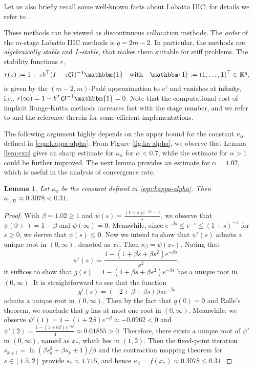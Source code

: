 \documentclass[a4paper, oneside]{book}
\def\R{{\mathbb R}}
\def\AA{\text{${\mathcal O}\hskip-3pt\iota$}}
\newtheorem{lemma}{Lemma}[section]
\begin{document}
Let us also briefly recall some  well-known facts about Lobatto IIIC; for details we refer to \cite{HairerWanner:2010}.

These methods can be viewed as discontinuous collocation methods.
The \textsl{order} of the $m$-stage Lobatto IIIC methods is
$q=2m-2$.
In particular, the methods are \textsl{algebraically stable} and
{\textsl{L-stable}}, that makes them suitable for stiff problems.
The stability functions $r$,
%
\[r(z):=1+z b^\top (I-z\AA)^{-1} \mathbbm{1}\quad\text{with}\quad  \mathbbm{1}:=(1,\dotsc,1)^\top\in \R^q,\]
%
is given by the $(m-2,m)$-Pad\'e
approximation to $e^z$ and
vanishes at infinity, i.e., $r(\infty)=1-b^T \AA^{-1} \mathbbm{1}=0.$
Note that the computational cost of implicit Runge-Kutta methods increases fast with the stage number, and we refer
to \cite{Butcher:1976, RK:1988, JN:1995} and the reference therein for some efficient implementations.

The following argument highly depends on the upper bound for the constant $\kappa_\alpha$
defined in \eqref{eqn:kappa-alpha}. From Figure \ref{fig:ka-alpha},
we observe that Lemma \ref{lem:exp} gives an sharp estimate
for $\kappa_\alpha$ for $\alpha<0.7$, while the estimate for $\alpha>1$ could be further improved. The next lemma provides an estimate for $\alpha=1.02$, which is useful in the analysis of convergence rate.

\begin{lemma}\label{lem:exp-102}
Let $\kappa_\alpha$ be the constant defined in \eqref{eqn:kappa-alpha}. Then $\kappa_{1.02} \approx 0.3078<0.31$.
\end{lemma}

\begin{proof}
With $\beta=1.02 \geq 1$ and $\psi(s) = \frac{(1+s)e^{-\beta s} - 1}{s}$,
we observe that
$\psi(0+) = 1-\beta$ and $\psi(\infty)= 0$.
Meanwhile, since $e^{-\beta s} \leq e^{-s} \leq (1+s)^{-1}$ for $s\ge0$,
we derive that $\psi(s) \leq 0$.
Now we intend to show that $\psi'(s)$ admits a unique root in $(0,\infty)$, denoted as $x_*$. Then $\kappa_{\beta} = \psi(x_*)$.
Noting that
$$\psi'(s) =
\frac{1-(1 + \beta s + \beta s^2)e^{-\beta s}}{s^2},$$
it suffices to show that
$g(s) = 1-(1 + \beta s + \beta s^2)e^{-\beta s}$ has a unique root in $(0,\infty)$.
It is straightforward to see that the function
$$g'(s) = (-2+\beta + \beta s)\beta s e^{-\beta s}$$
admits a unique root in $(0,\infty)$. Then by the fact that $g(0)=0$ and Rolle's theorem, we conclude that $g$ has at most one root in $(0,\infty)$.
Meanwhile, we observe $\psi'(1)=1-(1+2\beta)e^{-\beta} \approx -0.0962 <0$ and
$\psi'(2) = \frac{1-(1+6\beta)e^{-2\beta}}{4} \approx 0.01855 >0$.
Therefore, there exists a unique root of $\psi'$ in $(0, \infty)$, named as $x_*$,
which lies in $(1,2)$.
{Then the fixed-point iteration $s_{k+1} = \ln(\beta s_k^2+\beta s_k+1)/\beta$ and the contraction mapping theorem for $s\in[1.5,2]$ provide $s_*\approx 1.715$,
and hence $\kappa_\beta = f(x_*) \approx 0.3078 \le 0.31$.}
\end{proof}
\end{document}

